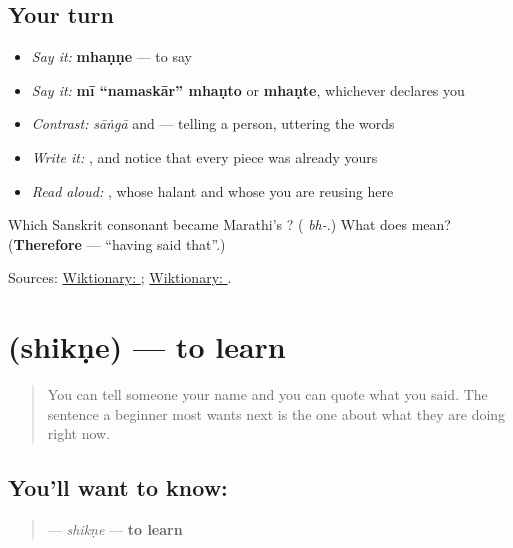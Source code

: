 \subsection*{Your turn}
\begin{itemize}
\raggedright
  \item \emph{Say it:} \textbf{mhaṇṇe} — to say
  \item \emph{Say it:} \textbf{mī \textquotedblleft{}namaskār\textquotedblright{} mhaṇto} or \textbf{mhaṇte}, whichever declares you
  \item \emph{Contrast:} \emph{sāṅgā} and \textbf{} — telling a person, uttering the words
  \item \emph{Write it:} \textbf{}, and notice that every piece was already yours
  \item \emph{Read aloud:} \textbf{}, whose halant and whose \textbf{} you are reusing here
\end{itemize}

\begin{tcolorbox}[breakable,colback=teal!4,colframe=teal!35!black,title={Before you move on}]
Which Sanskrit consonant became Marathi's \textbf{}? (\textbf{} \emph{bh-}.) What does \textbf{} mean? (\textbf{Therefore} — \textquotedblleft{}having said that\textquotedblright{}.)

Sources: \href{https://en.wiktionary.org/wiki/\%E0\%A4\%AE\%E0\%A5\%8D\%E0\%A4\%B9\%E0\%A4\%A3\%E0\%A4\%A3\%E0\%A5\%87}{Wiktionary: }; \href{https://en.wiktionary.org/wiki/\%E0\%A4\%AD\%E0\%A4\%A3\%E0\%A4\%A4\%E0\%A4\%BF}{Wiktionary: }.
\end{tcolorbox}
\section[shikṇe]{ (shikṇe) — to learn}

\label{lesson:MR-C24-shikne}



\begin{quote}
You can tell someone your name and you can quote what you said. The sentence a beginner most wants next is the one about what they are doing right now.
\end{quote}

\subsection*{You'll want to know: }
\begin{quote}
\textbf{} — \emph{shikṇe} — \textbf{to learn}
\end{quote}

